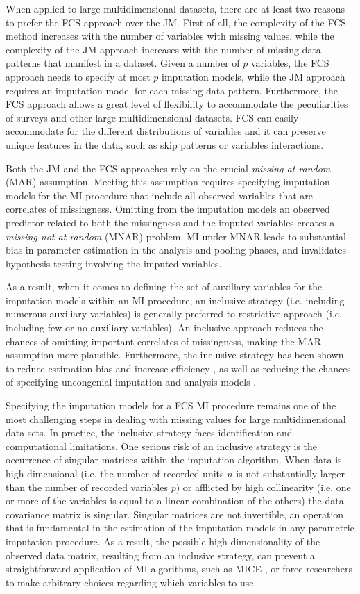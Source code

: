 When applied to large multidimensional datasets, there are at least two reasons to prefer the FCS approach over the JM.
First of all, the complexity of the FCS method increases with the number of variables with missing values, while the complexity
of the JM approach increases with the number of missing data patterns that manifest in a dataset.
Given a number of $p$ variables, the FCS approach needs to specify at most $p$ imputation models, while the JM 
approach requires an imputation model for each missing data pattern.
Furthermore, the FCS approach allows a great level of flexibility to accommodate the peculiarities of surveys and 
other large multidimensional datasets.
FCS can easily accommodate for the different distributions of variables and it can preserve unique features in the data,
such as skip patterns or variables interactions.

Both the JM and the FCS approaches rely on the crucial \emph{missing at random} (MAR) assumption.
Meeting this assumption requires specifying imputation models for the MI procedure that include all observed
variables that are correlates of missingness.
Omitting from the imputation models an observed predictor related to both the missingness and the imputed variables 
creates a \emph{missing not at random} (MNAR) problem.
MI under MNAR leads to substantial bias in parameter estimation in the analysis and pooling phases, and 
invalidates hypothesis testing involving the imputed variables.

As a result, when it comes to defining the set of auxiliary variables for the imputation models within an MI procedure, 
an inclusive strategy (i.e. including numerous auxiliary variables) is generally preferred to restrictive approach 
(i.e. including few or no auxiliary variables).
An inclusive approach reduces the chances of omitting important correlates of missingness, making the MAR assumption 
more plausible.
Furthermore, the inclusive strategy has been shown to reduce estimation bias and increase efficiency \citep{collinsEtAl:2001},
as well as reducing the chances of specifying uncongenial imputation and analysis models \citep{meng:1994}.

Specifying the imputation models for a FCS MI procedure remains one of the most challenging steps in dealing
with missing values for large multidimensional data sets.
In practice, the inclusive strategy faces identification and computational limitations.
One serious risk of an inclusive strategy is the occurrence of singular matrices within the imputation algorithm.
When data is high-dimensional (i.e. the number of recorded units $n$ is not substantially larger than the number of recorded 
variables $p$) or afflicted by high collinearity (i.e. one or more of the variables is equal to a linear 
combination of the others) the data covariance matrix is singular.
Singular matrices are not invertible, an operation that is fundamental in the estimation of the imputation 
models in any parametric imputation procedure.
As a result, the possible high dimensionality of the observed data matrix, resulting from an inclusive strategy, 
can prevent a straightforward application of MI algorithms, such as MICE \citep{vanBuuren:2012}, or force
researchers to make arbitrary choices regarding which variables to use.

